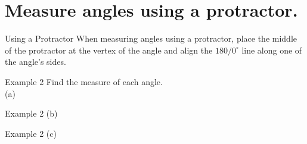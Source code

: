 \documentclass[t]{beamer}
\begin{document}
\section{Measure angles using a protractor.}

\begin{frame}{Using a Protractor}
When measuring angles using a protractor, place the middle of the protractor at the vertex of the angle and align the $180/0^\circ$ line along one of the angle's sides.

\end{frame}

\begin{frame}{Example 2}
Find the measure of each angle.	\newline\\
(a)	\quad	\onslide<3->{{$\color{red}\mathbf{90^\circ}$}}
\begin{center}
\end{center}
\end{frame}

\begin{frame}{Example 2}
(b)	\quad	\onslide<3->{{$\color{red}\mathbf{120^\circ}$}}
\begin{center}
\end{center}
\end{frame}

\begin{frame}{Example 2}
(c)	\quad	\onslide<3->{{$\color{red}\mathbf{75^\circ}$}}
\begin{center}
\end{center}
\end{frame}
\end{document}
